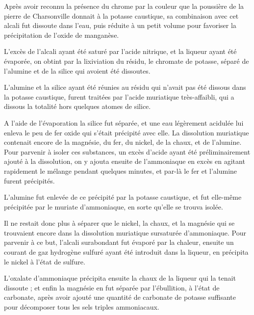 \documentclass[a4paper, 12pt, oneside, french]{article}
\begin{document}
Après avoir reconnu la présence du chrome par la couleur que la poussière de la pierre de Charsonville donnait à la potasse caustique, sa combinaison avec cet alcali fut dissoute dans l'eau, puis réduite à un petit volume pour favoriser la précipitation de l'oxide de manganèse.

L'excès de l'alcali ayant été saturé par l'acide nitrique, et la liqueur ayant été évaporée, on obtint par la lixiviation du résidu, le chromate de potasse, séparé de l'alumine et de la silice qui avoient été dissoutes.

L'alumine et la silice ayant été réunies au résidu qui n'avait pas été dissous dans la potasse caustique, furent traitées par l'acide muriatique très-affaibli, qui a dissous la totalité hors quelques atomes de silice.

A l'aide de l'évaporation la silice fut séparée, et une eau légèrement acidulée lui enleva le peu de fer oxide qui s'était précipité avec elle. La dissolution muriatique contenait encore de la magnésie, du fer, du nickel, de la chaux, et de l'alumine. Pour parvenir à isoler ces substances, un excès d'acide ayant été préliminairement ajouté à la dissolution, on y ajouta ensuite de l'ammoniaque en excès en agitant rapidement le mélange pendant quelques minutes, et par-là le fer et l'alumine furent précipités.

L'alumine fut enlevée de ce précipité par la potasse caustique, et fut elle-même précipitée par le muriate d'ammoniaque, en sorte qu'elle se trouva isolée.

Il ne restait donc plus à séparer que le nickel, la chaux, et la magnésie qui se trouvaient encore dans la dissolution muriatique sursaturée d'ammoniaque. Pour parvenir à ce but, l'alcali surabondant fut évaporé par la chaleur, ensuite un courant de gaz hydrogène sulfuré ayant été introduit dans la liqueur, en précipita le nickel à l'état de sulfure.

L'oxalate d'ammoniaque précipita ensuite la chaux de la liqueur qui la tenait dissoute ; et enfin la magnésie en fut séparée par l'ébullition, à l'état de carbonate, après avoir ajouté une quantité de carbonate de potasse suffisante pour décomposer tous les sels triples ammoniacaux.
\end{document}
